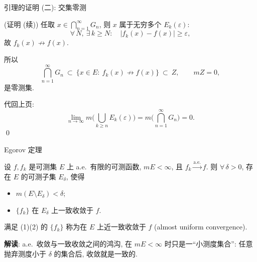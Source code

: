\begin{frame}{引理的证明 (二): 交集零测}

\startproof[bg=yellow, fg=red](证明 (续))
任取 $x \in \bigcap_{n=1}^{\infty} G_n$, 则 $x$ 属于\alert{无穷多个} $E_k(\varepsilon)$:
\[
\forall\, N,\ \exists\, k \geqslant N:\quad |f_k(x) - f(x)| \geqslant \varepsilon,
\]
故 $f_k(x) \not\to f(x)$.

\pause

所以
\[
\bigcap_{n=1}^{\infty} G_n
\ \subset\
\{x \in E:\ f_k(x) \not\to f(x)\}
\ \subset\ Z, \qquad mZ = 0,
\]
是零测集.

\pause

代回上页:
\[
\lim_{n\to\infty} m\Big(\bigcup_{k \geqslant n} E_k(\varepsilon)\Big)
= m\Big(\bigcap_{n=1}^{\infty} G_n\Big) = 0 .
\]
\qed

\end{frame}


\begin{frame}{Egorov 定理}

\begin{thm}[Egorov]
设 $f, f_k$ 是可测集 $E$ 上 a.e.\ 有限的可测函数, $mE < \infty$, 且 $f_k \xrightarrow{\text{a.e.}} f$. 则 $\forall\, \delta > 0$, 存在 $E$ 的可测子集 $E_\delta$, 使得
\begin{itemize}
\item[(1)] $m(E \setminus E_\delta) < \delta$;
\item[(2)] $\{f_k\}$ 在 $E_\delta$ 上\alert{一致}收敛于 $f$.
\end{itemize}
\end{thm}

\pause

\begin{Def}[近一致收敛]
满足 (1)(2) 的 $\{f_k\}$ 称为在 $E$ 上\alert{近一致收敛}于 $f$ (almost uniform convergence).
\end{Def}

\pause

\textbf{解读}: a.e.\ 收敛与一致收敛之间的鸿沟, 在 $mE < \infty$ 时只是一``\alert{小测度集合}'': 任意抛弃测度小于 $\delta$ 的集合后, 收敛就是一致的.

\end{frame}


